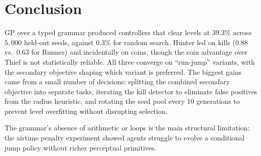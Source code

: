 \documentclass[runningheads]{llncs}
\begin{document}
\section{Conclusion}
\label{sec:conclusion}

GP over a typed grammar produced controllers that clear levels at 39.3\% across $5{,}000$ held-out seeds, against 0.3\% for random search. Hunter led on kills ($0.88$ vs.\ $0.63$ for Runner) and incidentally on coins, though the coin advantage over Thief is not statistically reliable. All three converge on ``run-jump'' variants, with the secondary objective shaping which variant is preferred. The biggest gains came from a small number of decisions: splitting the combined secondary objective into separate tasks, iterating the kill detector to eliminate false positives from the radius heuristic, and rotating the seed pool every 10 generations to prevent level overfitting without disrupting selection.

The grammar's absence of arithmetic or loops is the main structural limitation: the airtime penalty experiment showed agents struggle to evolve a conditional jump policy without richer perceptual primitives. 

\begingroup
\renewcommand{\thefootnote}{}
\addtocounter{footnote}{-1}
\endgroup


\footnotesize

\end{document}
